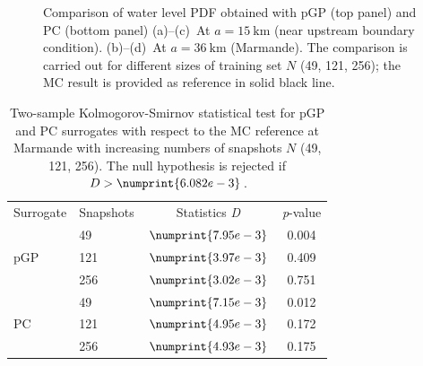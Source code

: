 \begin{figure}[!ht]
\caption{Comparison of water level PDF obtained with pGP (top panel) and PC (bottom panel) (a)--(c)~At $a = 15~\text{km}$ (near upstream boundary condition). (b)--(d)~At $a=36~\text{km}$ (Marmande). The comparison is carried out for different sizes of training set $N$ (49, 121, 256); the MC result is provided as reference in solid black line.}
\label{fig:pdf-station-0_9}
\end{figure}

\begin{table}[ht]
\centering
\caption{Two-sample Kolmogorov-Smirnov statistical test for pGP and PC surrogates with respect to the MC reference at Marmande with increasing numbers of snapshots $N$ (49, 121, 256). The null hypothesis is rejected if $D > \numprint{6.082e-3}$.}
\begin{tabular}{llcc}
\toprule
Surrogate & Snapshots & Statistics \emph{D} & \emph{p}-value \\
\cmidrule{3-4}
&49  & $\numprint{7.95e-3}$ & 0.004 \\
pGP&121 & $\numprint{3.97e-3}$ & 0.409 \\
&256 & $\numprint{3.02e-3}$& 0.751\\
\cmidrule{3-4}
&49  & $\numprint{7.15e-3}$ & 0.012 \\
PC&121 & $\numprint{4.95e-3}$ & 0.172  \\
&256 & $\numprint{4.93e-3}$ & 0.175\\
\bottomrule
\end{tabular}
\label{tab:ks}
\end{table}

